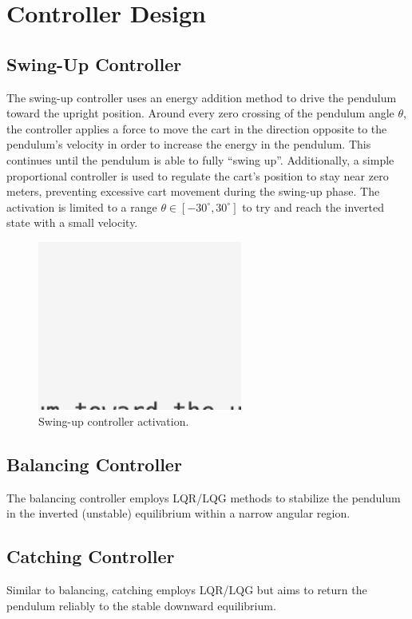 \documentclass[12pt]{article}
\begin{document}
\section{Controller Design}

\subsection{Swing-Up Controller}
The swing-up controller uses an energy addition method to drive the pendulum toward the upright position.
Around every zero crossing of the pendulum angle $\theta$, the controller applies a force to move the cart in the direction opposite to the pendulum's velocity in order to increase the energy in the pendulum.
This continues until the pendulum is able to fully ``swing up''.
Additionally, a simple proportional controller is used to regulate the cart's position to stay near zero meters, preventing excessive cart movement during the swing-up phase.
The activation is limited to a range $\theta \in [-30^\circ,30^\circ]$ to try and reach the inverted state with a small velocity.


\begin{figure}[H]
    \centering
    \includegraphics[width=0.6\textwidth]{figures/ph.png}
    \caption{Swing-up controller activation.}
    \label{fig:swingup}
\end{figure}

\subsection{Balancing Controller}
The balancing controller employs LQR/LQG methods to stabilize the pendulum in the inverted (unstable) equilibrium within a narrow angular region.

\subsection{Catching Controller}
Similar to balancing, catching employs LQR/LQG but aims to return the pendulum reliably to the stable downward equilibrium.
\end{document}
